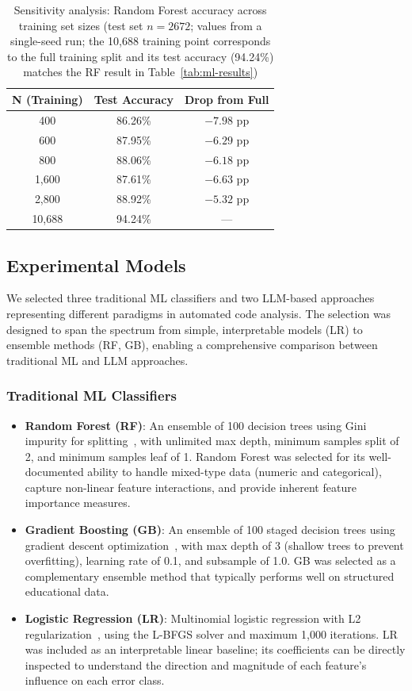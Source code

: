 \documentclass[acmsmall]{acmart}
\begin{document}
\begin{table}[htbp]
\centering
\caption{Sensitivity analysis: Random Forest accuracy across training set
sizes (test set $n=2{}672$; values from a single-seed run; the 10,688 training
point corresponds to the full training split and its test accuracy (94.24\%)
matches the RF result in Table~\ref{tab:ml-results})}
\label{tab:sensitivity}
\begin{tabular}{@{}ccc@{}}
\toprule
N (Training) & Test Accuracy & Drop from Full \\
\midrule
400 & 86.26\% & $-7.98$ pp \\
600 & 87.95\% & $-6.29$ pp \\
800 & 88.06\% & $-6.18$ pp \\
1,600 & 87.61\% & $-6.63$ pp \\
2,800 & 88.92\% & $-5.32$ pp \\
10,688 & 94.24\% & --- \\
\bottomrule
\end{tabular}
\end{table}

\subsection{Experimental Models}

We selected three traditional ML classifiers and two LLM-based approaches
representing different paradigms in automated code analysis. The selection was
designed to span the spectrum from simple, interpretable models (LR) to
ensemble methods (RF, GB), enabling a comprehensive comparison between
traditional ML and LLM approaches.

\subsubsection*{Traditional ML Classifiers}
\begin{itemize}
 \item \textbf{Random Forest (RF)}: An ensemble of 100 decision trees using
 Gini impurity for splitting~\cite{breiman2001random}, with unlimited
 max depth, minimum samples split of 2, and minimum samples leaf of 1.
 Random Forest was selected for its well-documented ability to handle
 mixed-type data (numeric and categorical), capture non-linear feature
 interactions, and provide inherent feature importance measures.
 \item \textbf{Gradient Boosting (GB)}: An ensemble of 100 staged
 decision trees using gradient descent
 optimization~\cite{friedman2001greedy}, with max depth
 of 3 (shallow trees to prevent overfitting), learning rate of 0.1,
 and subsample of 1.0. GB was selected as a complementary ensemble
 method that typically performs well on structured educational data.
 \item \textbf{Logistic Regression (LR)}: Multinomial logistic regression
 with L2 regularization~\cite{hosmer2013logistic}, using the L-BFGS
 solver and maximum 1,000 iterations. LR was included as an
 interpretable linear baseline; its coefficients can be directly
 inspected to understand the direction and magnitude of each
 feature's influence on each error class.
\end{itemize}
\end{document}
